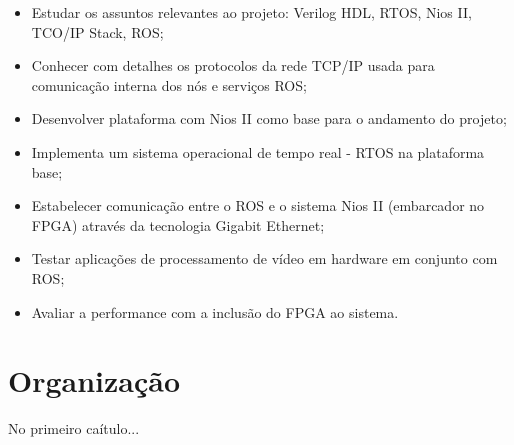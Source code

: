 \begin{itemize}
    \item Estudar os assuntos relevantes ao projeto: Verilog HDL, RTOS, Nios II, TCO/IP Stack, ROS;
    \item Conhecer com detalhes os protocolos da rede TCP/IP usada para comunicação interna dos nós e serviços ROS;
    \item Desenvolver plataforma com Nios II como base para o andamento do projeto;
    \item Implementa um sistema operacional de tempo real - RTOS na plataforma base;
    \item Estabelecer comunicação entre o ROS e o sistema Nios II (embarcador no FPGA) através da tecnologia Gigabit Ethernet;
    \item Testar aplicações de processamento de vídeo em hardware em conjunto com ROS;
    \item Avaliar a performance com a inclusão do FPGA ao sistema.
\end{itemize}


\section{Organização}

 No primeiro caítulo...